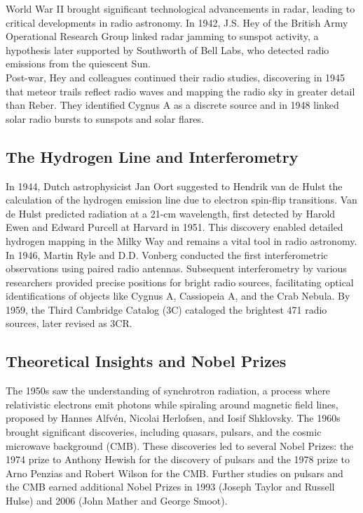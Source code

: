 World War II brought significant technological advancements in radar, leading to critical developments in radio astronomy. In 1942, J.S. Hey of the British Army Operational Research Group linked radar jamming to sunspot activity, a hypothesis later supported by Southworth of Bell Labs, who detected radio emissions from the quiescent Sun. \\

Post-war, Hey and colleagues continued their radio studies, discovering in 1945 that meteor trails reflect radio waves and mapping the radio sky in greater detail than Reber. They identified Cygnus A as a discrete source and in 1948 linked solar radio bursts to sunspots and solar flares.

\subsection{The Hydrogen Line and Interferometry}

In 1944, Dutch astrophysicist Jan Oort suggested to Hendrik van de Hulst the calculation of the hydrogen emission line due to electron spin-flip transitions. Van de Hulst predicted radiation at a 21-cm wavelength, first detected by Harold Ewen and Edward Purcell at Harvard in 1951. This discovery enabled detailed hydrogen mapping in the Milky Way and remains a vital tool in radio astronomy. \\

In 1946, Martin Ryle and D.D. Vonberg conducted the first interferometric observations using paired radio antennas. Subsequent interferometry by various researchers provided precise positions for bright radio sources, facilitating optical identifications of objects like Cygnus A, Cassiopeia A, and the Crab Nebula. By 1959, the Third Cambridge Catalog (3C) cataloged the brightest 471 radio sources, later revised as 3CR.

\subsection{Theoretical Insights and Nobel Prizes}

The 1950s saw the understanding of synchrotron radiation, a process where relativistic electrons emit photons while spiraling around magnetic field lines, proposed by Hannes Alfvén, Nicolai Herlofsen, and Iosif Shklovsky. The 1960s brought significant discoveries, including quasars, pulsars, and the cosmic microwave background (CMB). These discoveries led to several Nobel Prizes: the 1974 prize to Anthony Hewish for the discovery of pulsars and the 1978 prize to Arno Penzias and Robert Wilson for the CMB. Further studies on pulsars and the CMB earned additional Nobel Prizes in 1993 (Joseph Taylor and Russell Hulse) and 2006 (John Mather and George Smoot).

